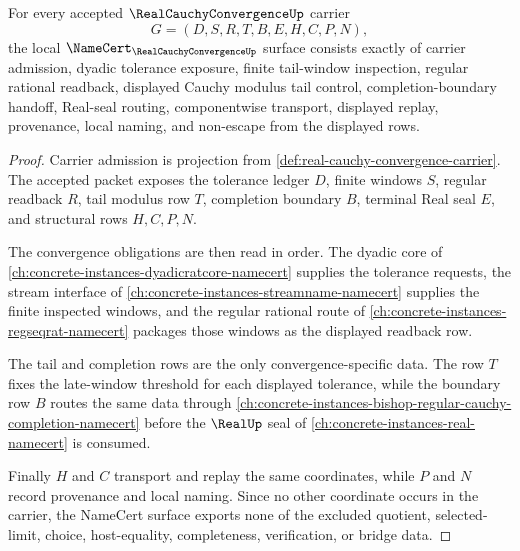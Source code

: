 \begin{theorem}
\label{thm:real-cauchy-convergence-namecert-obligations}
For every accepted $\RealCauchyConvergenceUp$ carrier
$$
G=(D,S,R,T,B,E,H,C,P,N),
$$
the local $\NameCert_{\RealCauchyConvergenceUp}$ surface consists exactly of carrier admission, dyadic tolerance exposure, finite tail-window inspection, regular rational readback, displayed Cauchy modulus tail control, completion-boundary handoff, Real-seal routing, componentwise transport, displayed replay, provenance, local naming, and non-escape from the displayed rows.
\end{theorem}
\begin{proof}
Carrier admission is projection from \autoref{def:real-cauchy-convergence-carrier}. The accepted packet exposes the tolerance ledger $D$, finite windows $S$, regular readback $R$, tail modulus row $T$, completion boundary $B$, terminal Real seal $E$, and structural rows $H,C,P,N$.

The convergence obligations are then read in order. The dyadic core of \autoref{ch:concrete-instances-dyadicratcore-namecert} supplies the tolerance requests, the stream interface of \autoref{ch:concrete-instances-streamname-namecert} supplies the finite inspected windows, and the regular rational route of \autoref{ch:concrete-instances-regseqrat-namecert} packages those windows as the displayed readback row.

The tail and completion rows are the only convergence-specific data. The row $T$ fixes the late-window threshold for each displayed tolerance, while the boundary row $B$ routes the same data through \autoref{ch:concrete-instances-bishop-regular-cauchy-completion-namecert} before the $\RealUp$ seal of \autoref{ch:concrete-instances-real-namecert} is consumed.

Finally $H$ and $C$ transport and replay the same coordinates, while $P$ and $N$ record provenance and local naming. Since no other coordinate occurs in the carrier, the NameCert surface exports none of the excluded quotient, selected-limit, choice, host-equality, completeness, verification, or bridge data.
\end{proof}

